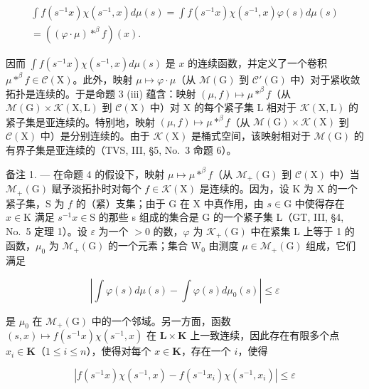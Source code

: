 \[
\begin{array}{c} \int f (s ^ {- 1} x) \chi (s ^ {- 1}, x) d \mu (s) = \int f (s ^ {- 1} x) \chi (s ^ {- 1}, x) \varphi (s) d \mu (s) \\ = ((\varphi \cdot \mu) * ^ {\beta} f) (x). \end{array}
\]

因而 \(\int f(s^{-1}x)\chi(s^{-1},x)d\mu(s)\) 是 \(x\) 的连续函数，并定义了一个卷积 \(\mu * ^ {\beta} f\in \mathcal{C}(\mathrm{X})\)。此外，映射 \(\mu \mapsto \varphi \cdot \mu\)（从 \(\mathcal{M}(\mathrm{G})\) 到 \(\mathcal{C}'(\mathrm{G})\) 中）对于紧收敛拓扑是连续的。于是命题 3 (iii) 蕴含：映射 \((\mu ,f)\mapsto \mu * ^ {\beta} f\)（从 \(\mathcal{M}(\mathrm{G})\times \mathcal{K}(\mathrm{X},\mathrm{L})\) 到 \(\mathcal{C}(\mathrm{X})\) 中）对 X 的每个紧子集 L 相对于 \(\mathcal{K}(\mathrm{X},\mathrm{L})\) 的紧子集是亚连续的。特别地，映射 \((\mu ,f)\mapsto \mu * ^ {\beta} f\)（从 \(\mathcal{M}(\mathrm{G})\times \mathcal{K}(\mathrm{X})\) 到 \(\mathcal{C}(\mathrm{X})\) 中）是分别连续的。由于 \(\mathcal{K}(\mathrm{X})\) 是桶式空间，该映射相对于 \(\mathcal{M}(\mathrm{G})\) 的有界子集是亚连续的（TVS, III, §5, No.~3 命题 6）。

备注 1. --- 在命题 4 的假设下，映射 \(\mu \mapsto \mu *^{\beta}f\)（从 \(\mathcal{M}_{+}(\mathrm{G})\) 到 \(\mathcal{C}(\mathrm{X})\) 中）当 \(\mathcal{M}_{+}(\mathrm{G})\) 赋予淡拓扑时对每个 \(f\in \mathcal{K}(\mathrm{X})\) 是连续的。因为，设 K 为 X 的一个紧子集，S 为 \(f\) 的（紧）支集；由于 G 在 X 中真作用，由 \(s\in \mathrm{G}\) 中使得存在 \(x\in \mathrm{K}\) 满足 \(s^{-1}x\in \mathrm{S}\) 的那些 s 组成的集合是 G 的一个紧子集 L（GT, III, §4, No.~5 定理 1）。设 \(\varepsilon\) 为一个 \(>0\) 的数，\(\varphi\) 为 \(\mathcal{K}_{+}(\mathrm{G})\) 中在紧集 L 上等于 1 的函数，\(\mu_0\) 为 \(\mathcal{M}_{+}(\mathrm{G})\) 的一个元素；集合 \(\mathrm{W}_0\) 由测度 \(\mu \in \mathcal{M}_{+}(\mathrm{G})\) 组成，它们满足

\[
\left| \int \varphi (s) d \mu (s) - \int \varphi (s) d \mu_ {0} (s) \right| \leqslant \varepsilon
\]

是 \(\mu_0\) 在 \(\mathcal{M}_{+}(\mathrm{G})\) 中的一个邻域。另一方面，函数 \((s,x)\mapsto f(s^{-1}x)\chi (s^{-1},x)\) 在 \(\mathbf{L}\times \mathbf{K}\) 上一致连续，因此存在有限多个点 \(x_{i}\in \mathbf{K}\)（\(1\leqslant i\leqslant n\)），使得对每个 \(x\in \mathbf{K}\)，存在一个 \(i\)，使得

\[
\left| f (s ^ {- 1} x) \chi (s ^ {- 1}, x) - f (s ^ {- 1} x _ {i}) \chi (s ^ {- 1}, x _ {i}) \right| \leqslant \varepsilon
\]

